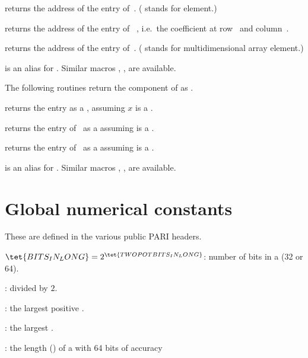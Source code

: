  returns the address of the
 entry of~. ( stands for element.)

 returns the address of the
 entry of ~, i.e.~the coefficient at row~
and column~.

 returns the address of the
 entry of~. ( stands for multidimensional array
element.)

 is an alias for .
Similar macros , ,  are available.

\noindent The following routines return the component of  as
.

 returns the entry  as a ,
assuming $x$ is a .

 returns the  entry of~ as
a  assuming  is a .

 returns the  entry of~ as
a  assuming  is a .

 is an alias for .
Similar macros , ,  are available.

\section{Global numerical constants}
These are defined in the various public PARI headers.


\noindent {} $\tet{BITS_IN_LONG} = 2^{\tet{TWOPOTBITS_IN_LONG}}$:
number of bits in a  (32 or 64).

\noindent {} :  divided by
$2$.

\noindent {} : the largest positive .

\noindent {} : the largest .

\noindent {} :    the length () of a
 with 64 bits of accuracy

